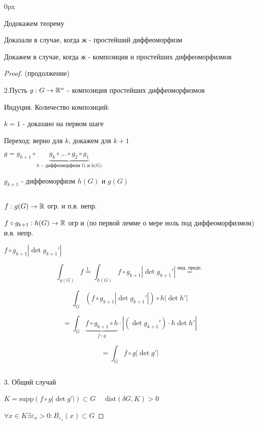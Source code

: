 
\parindent 0px

\usepackage{amsfonts, amssymb, amsmath, mathtools, amsthm}  %
\usepackage{mathrsfs}


\renewcommand{\baselinestretch}{1.3} 
\setcounter{lemma}{19}


    Додокажем теорему

    Доказали в случае, когда ж - простейший диффеоморфизм 
    
    Докажем в случае, когда ж - композиция н простейших диффеоморфизмов
    
    \begin{proof} (продолжение)
        
        2.Пусть $g: G \to \mathbb{R}^n$ - композиция простейших диффеоморфизмов
        
        Индуция. Количество композиций: 
        
        $k=1$ - доказано на первом шаге

        Переход: верно для $k$, докажем для $k+1$

        $g = g_{k+1}\circ \underbrace{g_k \circ \dotsc \circ g_2 \circ g_1}_{h - \text{диффеоморфизм G и h(G)}}$

        $g_{k+1}$ - диффеоморфизм $h(G)$ и $g(G)$

        \par $ $

        $f: g(G) \to \mathbb{R} $ огр. и п.в. непр.

        $f\circ g_{k+1}:h(G) \to \mathbb{R}$ огр и (по первой лемме о мере ноль под диффеоморфизмом) и.в. непр.

        $f\circ g_{k+1} |\det g_{k+1}'|$

        $$\int_{g(G)} f \overset{1.}{=} \int_{h(G)} f \circ g_{k+1} | \det g_{k+1}'| \overset{\text{инд. предп.}}{=} $$

        $$\int_G (f\circ g_{k+1} | \det g_{k+1}'|) \circ h |\det h'|$$

        $$= \int_G \underbrace{f\circ g_{k+1}\circ h}_{f \circ g} \cdot | (\det g_{k+1}') \cdot h\det h'|$$

        $$=\int_G f \circ g |\det g'|$$

        \par $ $

        3. Общий случай

        $K = \text{supp}(f\circ g | \det g'|) \subset G \quad $
        $\text{dist}(\delta G, K) > 0$

        $\forall x \in K \exists \varepsilon_x > 0: B_{\varepsilon_x}(x) \subset G$


\end{proof}
